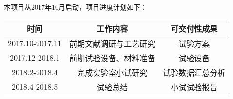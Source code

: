本项目从2017年10月启动，项目进度计划如下：\par
\begin{tabular}{|c|c|c|}
\hline
时间 & 工作内容 & 可交付性成果\\
\hline
2017.10-2017.11 & 前期文献调研与工艺研究 & 试验方案\\
\hline
2017.12-2018.1 & 前期试验设备、材料准备 & 试验设备\\
\hline
2018.2-2018.4 & 完成实验室小试研究 & 试验数据汇总分析\\
\hline
2018.4-2018.5 & 试验总结 & 小试试验报告\\
\hline
\end{tabular}
\par